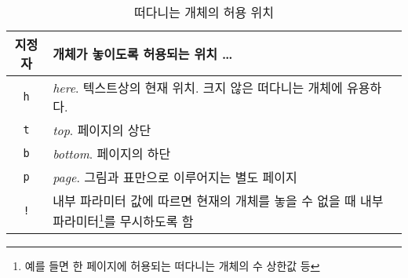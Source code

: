 \begin{table}[!bp]
\caption{떠다니는 개체의 허용 위치}\label{tab:permiss}
\noindent \begin{minipage}{\textwidth}
\medskip
\begin{center}
\begin{tabular}{@{}cp{8cm}@{}}
지정자&개체가 놓이도록 허용되는 위치 \ldots\\
\hline
\rule{0pt}{1.05em}\texttt{h} & \emph{here}. 텍스트상의 현재 위치. 크지 않은 떠다니는 개체에 유용하다.\\[0.3ex]
\texttt{t} & \emph{top}. 페이지의 상단\\[0.3ex]
\texttt{b} & \emph{bottom}. 페이지의 하단\\[0.3ex]
\texttt{p} & \emph{page}. 그림과 표만으로 이루어지는 별도 페이지\\[0.3ex]
\texttt{!} & 내부 파라미터 값에 따르면 현재의 개체를 놓을 수 없을 때 내부 파라미터\footnote{예를 들면 한 페이지에 허용되는 떠다니는 개체의 수 상한값 등}를 무시하도록 함
\end{tabular}
\end{center}
\end{minipage}
\end{table}

